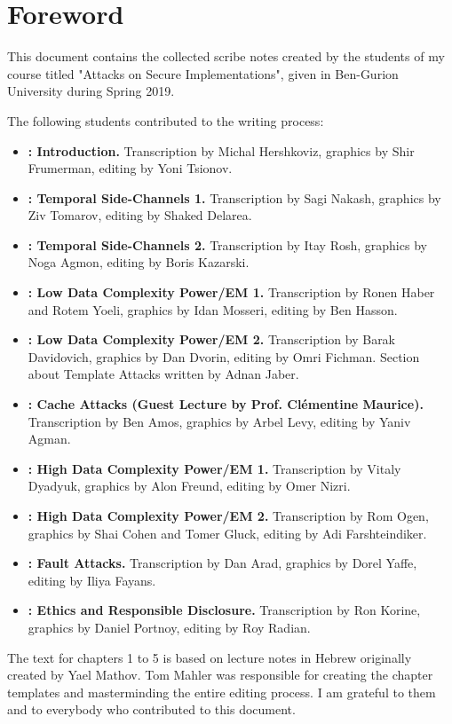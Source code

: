 \chapter*{Foreword} \label{chap:foreword}

This document contains the collected scribe notes created by the students of
my course titled "Attacks on Secure Implementations", given in
Ben-Gurion University during Spring 2019. 

The following students contributed to the writing process:
\begin{itemize}
    \item \textbf{: Introduction.}	Transcription by Michal Hershkoviz,
    graphics by	Shir Frumerman, editing by Yoni Tsionov.
    \item \textbf{: Temporal Side-Channels 1.}	Transcription by Sagi Nakash,
    graphics by	Ziv Tomarov, editing by Shaked Delarea.
    \item \textbf{: Temporal Side-Channels 2.}	Transcription by Itay Rosh,
    graphics by	Noga Agmon, editing by Boris Kazarski.
    \item \textbf{: Low Data Complexity Power/EM 1.}	Transcription by Ronen Haber
    and Rotem Yoeli, graphics by Idan Mosseri, editing by Ben Hasson.
    \item \textbf{: Low Data Complexity Power/EM 2.}	Transcription by Barak Davidovich,
    graphics by	Dan Dvorin, editing by Omri Fichman. Section about Template
    Attacks written by Adnan Jaber.
    \item \textbf{: Cache Attacks (Guest Lecture by Prof. Clémentine Maurice).}	Transcription by Ben Amos,
    graphics by	Arbel Levy, editing by Yaniv Agman.
    \item \textbf{: High Data Complexity Power/EM 1.}	Transcription by Vitaly
    Dyadyuk, graphics by	Alon Freund, editing by Omer Nizri.
    \item \textbf{: High Data Complexity Power/EM 2.}	Transcription by Rom Ogen,
    graphics by	Shai Cohen and Tomer Gluck, editing by Adi Farshteindiker.
    \item \textbf{: Fault Attacks.}	Transcription by Dan Arad,
    graphics by	Dorel Yaffe, editing by Iliya Fayans.
    \item \textbf{: Ethics and Responsible Disclosure.}	Transcription by Ron Korine,
    graphics by	Daniel Portnoy, editing by Roy Radian.
\end{itemize}

The text for chapters 1 to 5 is based on lecture notes in Hebrew originally
created by Yael Mathov. Tom Mahler was responsible for creating the chapter
templates and masterminding the entire editing process. I am grateful to them
and to everybody who contributed to this document.